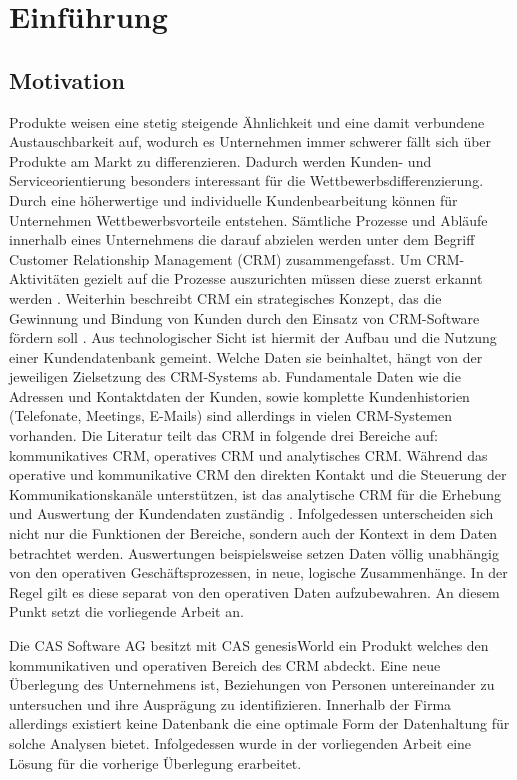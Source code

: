 \chapter{Einführung}
\label{ch:Einfuehrung}

\section{Motivation}
\label{ch:Einfuehrung:sec:Motivation}

Produkte weisen eine stetig steigende Ähnlichkeit und eine damit verbundene Austauschbarkeit auf, wodurch es Unternehmen immer schwerer fällt sich über Produkte am Markt zu differenzieren. Dadurch werden Kunden- und Serviceorientierung besonders interessant für die Wettbewerbsdifferenzierung. Durch eine höherwertige und individuelle Kundenbearbeitung können für Unternehmen Wettbewerbsvorteile entstehen. Sämtliche Prozesse und Abläufe innerhalb eines Unternehmens die darauf abzielen werden unter dem Begriff Customer Relationship Management (CRM) zusammengefasst. Um CRM-Aktivitäten gezielt auf die Prozesse auszurichten müssen diese zuerst erkannt werden \cite{SWB-1001}. Weiterhin beschreibt CRM ein strategisches Konzept, das die Gewinnung und Bindung von Kunden durch den Einsatz von CRM-Software fördern soll \cite{SWB-1001}. Aus technologischer Sicht ist hiermit der Aufbau und die Nutzung einer Kundendatenbank gemeint. Welche Daten sie beinhaltet, hängt von der jeweiligen Zielsetzung des CRM-Systems ab. Fundamentale Daten wie die Adressen und Kontaktdaten der Kunden, sowie komplette Kundenhistorien (Telefonate, Meetings, E-Mails) sind allerdings in vielen CRM-Systemen vorhanden. Die Literatur teilt das CRM in folgende drei Bereiche auf: kommunikatives CRM, operatives CRM und analytisches CRM. Während das operative und kommunikative CRM den direkten Kontakt und die Steuerung der Kommunikationskanäle unterstützen, ist das analytische CRM für die Erhebung und Auswertung der Kundendaten zuständig \cite{SWB-375372644}. Infolgedessen unterscheiden sich nicht nur die Funktionen der Bereiche, sondern auch der Kontext in dem Daten betrachtet werden. Auswertungen beispielsweise setzen Daten völlig unabhängig von den operativen Geschäftsprozessen, in neue, logische Zusammenhänge. In der Regel gilt es diese separat von den operativen Daten aufzubewahren. An diesem Punkt setzt die vorliegende Arbeit an. 

Die CAS Software AG besitzt mit CAS genesisWorld ein Produkt welches den kommunikativen und operativen Bereich des CRM abdeckt. Eine neue Überlegung des Unternehmens ist, Beziehungen von Personen untereinander zu untersuchen und ihre Ausprägung zu identifizieren. Innerhalb der Firma allerdings existiert keine Datenbank die eine optimale Form der Datenhaltung für solche Analysen bietet. Infolgedessen wurde in der vorliegenden Arbeit eine Lösung für die vorherige Überlegung erarbeitet.


